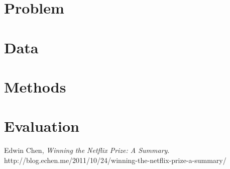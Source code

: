 \documentclass[12pt]{article}
\begin{document}

\section{Problem}

\newcommand{\bestRSS}{???}
\newcommand{\bestRMSE}{???}
\newcommand{\bestK}{???}
\newcommand{\bestNetflixRMSE}{0.88}

\newcommand{\numBusCA}{???} 
\newcommand{\numBusTotal}{???}

\newcommand{\numRatingCA}{???} 
\newcommand{\numRatingTotal}{???}

\section{Data}


\section{Methods}


\section{Evaluation}



\begin{thebibliography}{9}

  Edwin Chen,
  \emph{Winning the Netflix Prize: A Summary}.
  http://blog.echen.me/2011/10/24/winning-the-netflix-prize-a-summary/
\end{thebibliography}
\end{document}
